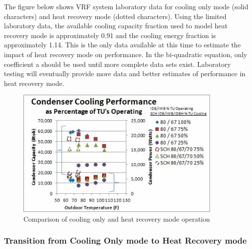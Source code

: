 The figure below shows VRF system laboratory data for cooling only mode (solid characters) and heat recovery mode (dotted characters). Using the limited laboratory data, the available cooling capacity fraction used to model heat recovery mode is approximately 0.91 and the cooling energy fraction is approximately 1.14. This is the only data available at this time to estimate the impact of heat recovery mode on performance. In the bi-quadratic equation, only coefficient a should be used until more complete data sets exist. Laboratory testing will eventually provide more data and better estimates of performance in heat recovery mode.

\begin{figure}[hbtp] %
\centering
\includegraphics[width=0.9\textwidth, height=0.9\textheight, keepaspectratio=true]{media/image5366.png}
\caption{Comparison of cooling only and heat recovery mode operation \label{fig:comparison-of-cooling-only-and-heat-recovery-mode-operation}}
\end{figure}

\subsubsection{Transition from Cooling Only mode to Heat Recovery mode}\label{transition-from-cooling-only-mode-to-heat-recovery-mode}

